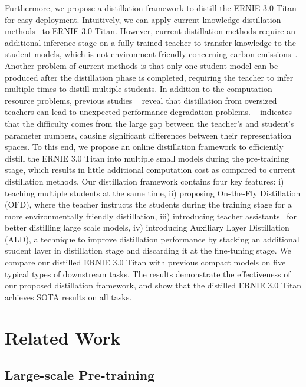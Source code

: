 Furthermore, we propose a distillation framework to distill the ERNIE 3.0 Titan for easy deployment. Intuitively, we can apply current knowledge distillation methods~\cite{tinybert,minilm,minilmv2,ernie-tiny} to ERNIE 3.0 Titan. However, current distillation methods require an additional inference stage on a fully trained teacher to transfer knowledge to the student models, which is not environment-friendly concerning carbon emissions~\cite{carbon}. Another problem of current methods is that only one student model can be produced after the distillation phase is completed, requiring the teacher to infer multiple times to distill multiple students. In addition to the computation resource problems, previous studies ~\cite{teacher-assistant, KDefficacy, rco, follow-your-path} reveal that distillation from oversized teachers can lead to unexpected performance degradation problems.
~\cite{teacher-assistant, KDefficacy, skd} indicates that the difficulty comes from the large gap between the teacher's and student's parameter numbers, causing significant differences between their representation spaces. To this end, we propose an online distillation framework to efficiently distill the ERNIE 3.0 Titan into multiple small models during the pre-training stage, which results in little additional computation cost as compared to current distillation methods. Our distillation framework contains four key features: i)  teaching multiple students at the same time, ii) proposing On-the-Fly Distillation (OFD), where the teacher instructs the students during the training stage for a more environmentally friendly distillation, iii) introducing teacher assistants~\cite{teacher-assistant} for better distilling large scale models, iv) introducing Auxiliary Layer Distillation (ALD), a technique to improve distillation performance by stacking an additional student layer in distillation stage and discarding it at the fine-tuning stage. We compare our distilled ERNIE 3.0 Titan with previous compact models on five typical types of downstream tasks. The results demonstrate the effectiveness of our proposed distillation framework, and show that the distilled ERNIE 3.0 Titan achieves SOTA results on all tasks.

\section{Related Work} 
\subsection{Large-scale Pre-training}

